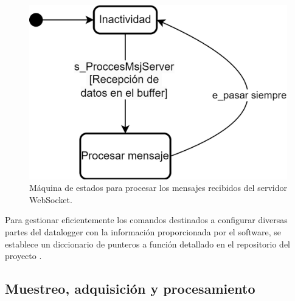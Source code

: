 \begin{figure}[H]
    \centering
    \includegraphics[width=0.5\linewidth]{Figuras/datalogger/Firmware/sc_processComand.png}
    \caption{Máquina de estados para procesar los mensajes recibidos del servidor WebSocket.}
    \label{fig:sc_processComand}
\end{figure}

Para gestionar eficientemente los comandos destinados a configurar diversas partes del datalogger con la información proporcionada por el software, se establece un diccionario de punteros a función detallado en el repositorio del proyecto \cite{FirmwareSCA2024}.





\subsection{Muestreo, adquisición y procesamiento}\label{sec:muestreo_adquisicion_procesamiento}


